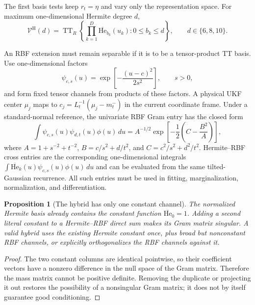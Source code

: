 \documentclass[11pt]{article}
\newtheorem{proposition}{Proposition}
\begin{document}
The first basis tests keep $r_t=\eta$ and vary only the representation space.
For maximum one-dimensional Hermite degree $d$,
\begin{equation}\label{eq:coherent-hermite-ladder}
 \mathcal V^{\mathrm H}(d)=\operatorname{TT}_R
 \left\{\prod_{k=1}^D\overline{\mathrm{He}}_{b_k}(u_k):0\leq b_k\leq d\right\},
 \qquad d\in\{6,8,10\}.
\end{equation}

An RBF extension must remain separable if it is to be a tensor-product TT
basis. Use one-dimensional factors
\begin{equation}\label{eq:coherent-rbf-factor}
 \psi_{c,s}(u)=\exp\left[-\frac{(u-c)^2}{2s^2}\right],
 \qquad s>0,
\end{equation}
and form fixed tensor channels from products of these factors. A physical UKF
center $\mu_j$ maps to $c_j=L_t^{-1}(\mu_j-m_t^-)$ in the current coordinate
frame. Under a standard-normal reference, the univariate RBF Gram entry has
the closed form
\begin{equation}\label{eq:coherent-rbf-gram}
 \int\psi_{c,s}(u)\psi_{d,t}(u)\phi(u)\,du
 =A^{-1/2}\exp\left[-\frac12\left(C-\frac{B^2}{A}\right)\right],
\end{equation}
where $A=1+s^{-2}+t^{-2}$,
$B=c/s^2+d/t^2$, and $C=c^2/s^2+d^2/t^2$. Hermite--RBF cross entries are
the corresponding one-dimensional integrals
$\int\overline{\mathrm{He}}_k(u)\psi_{c,s}(u)\phi(u)\,du$ and can be
evaluated from the same tilted-Gaussian recurrence. All such entries must be
used in fitting, marginalization, normalization, and differentiation.

\begin{proposition}[The hybrid has only one constant channel]
\label{prop:coherent-hybrid-constant}
The normalized Hermite basis already contains the constant function
$\overline{\mathrm{He}}_0=1$. Adding a second literal constant to a
Hermite--RBF direct sum makes its Gram matrix singular. A valid hybrid uses
the existing Hermite constant once, plus broad but nonconstant RBF channels,
or explicitly orthogonalizes the RBF channels against it.
\end{proposition}

\begin{proof}
The two constant columns are identical pointwise, so their coefficient vectors
have a nonzero difference in the null space of the Gram matrix. Therefore the
mass matrix cannot be positive definite. Removing the duplicate or projecting
it out restores the possibility of a nonsingular Gram matrix; it does not by
itself guarantee good conditioning.
\end{proof}
\end{document}
